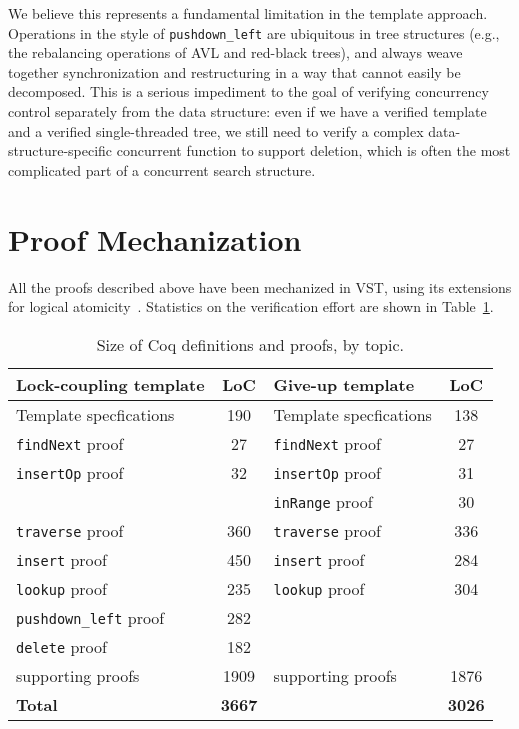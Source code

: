 \documentclass[a4paper,UKenglish,cleveref, autoref, thm-restate]{lipics-v2021}
\begin{document}
We believe this represents a fundamental limitation in the template approach. Operations in the style of \lstinline{pushdown_left} are ubiquitous in tree structures (e.g., the rebalancing operations of AVL and red-black trees), and always weave together synchronization and restructuring in a way that cannot easily be decomposed. This is a serious impediment to the goal of verifying concurrency control separately from the data structure: even if we have a verified template and a verified single-threaded tree, we still need to verify a complex data-structure-specific concurrent function to support deletion, which is often the most complicated part of a concurrent search structure.

\section{Proof Mechanization}
\label{proof_mech}
All the proofs described above have been mechanized in VST, using its extensions for logical atomicity~\cite{iris-vst-arxiv}. Statistics on the verification effort are shown in Table~\ref{table_coq}.

\begin{table}[h]
	\begin{center}
		\begin{tabular}{l | c || l | c } 
			\hline
			\textbf{Lock-coupling template} & \textbf{LoC} & \textbf{Give-up  template} & \textbf{LoC} \\
			\hline
			Template specfications & 190 & Template specfications & 138 \\
			\texttt{findNext} proof 	& 27  & \texttt{findNext} proof & 27 \\
			\texttt{insertOp} proof 	& 32  & \texttt{insertOp} proof & 31 \\
			& & \texttt{inRange} proof & 30 \\
			\texttt{traverse} proof	& 360  & \texttt{traverse} proof & 336 \\ 
			\texttt{insert} proof 	   		& 450  & \texttt{insert} proof & 284 \\
			\texttt{lookup} proof 	   	& 235  &  \texttt{lookup} proof & 304 \\ 
			\texttt{pushdown\_left} proof 	   	& 282 & & \\	
			\texttt{delete} proof 		& 182	 &   & 	 \\
			supporting proofs    & 	1909	 & supporting proofs 	& 1876 \\
			\hline
			\textbf{Total} & \textbf{3667} & & \textbf{3026}  
		\end{tabular}
		\caption{Size of Coq definitions and proofs, by topic.}
		\label{table_coq}
	\end{center}
\end{table}
\end{document}
